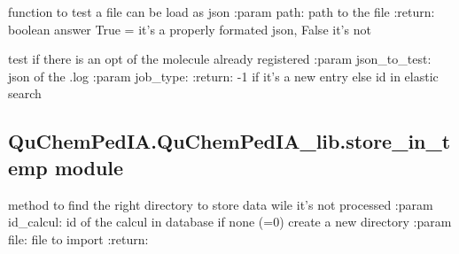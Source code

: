 \documentclass[letterpaper,10pt,english]{sphinxmanual}
\begin{document}
\begin{fulllineitems}
\label{\detokenize{QuChemPedIA.QuChemPedIA_lib:QuChemPedIA.QuChemPedIA_lib.import_file_lib.is_json}}
function to test a file can be load as json
:param path: path to the file
:return: boolean answer True = it’s a properly formated json, False it’s not

\end{fulllineitems}


\begin{fulllineitems}
\label{\detokenize{QuChemPedIA.QuChemPedIA_lib:QuChemPedIA.QuChemPedIA_lib.import_file_lib.is_opt_exist}}
test if there is an opt of the molecule already registered
:param json\_to\_test: json of the .log
:param job\_type:
:return: -1 if it’s a new entry else id in elastic search

\end{fulllineitems}



\subsection{QuChemPedIA.QuChemPedIA\_lib.store\_in\_temp module}
\label{\detokenize{QuChemPedIA.QuChemPedIA_lib:module-QuChemPedIA.QuChemPedIA_lib.store_in_temp}}\label{\detokenize{QuChemPedIA.QuChemPedIA_lib:quchempedia-quchempedia-lib-store-in-temp-module}}

\begin{fulllineitems}
\label{\detokenize{QuChemPedIA.QuChemPedIA_lib:QuChemPedIA.QuChemPedIA_lib.store_in_temp.store_in_temp}}
method to find the right directory to store data wile it’s not processed
:param id\_calcul: id of the calcul in database if none (=0) create a new directory
:param file: file to import
:return:

\end{fulllineitems}
\end{document}
